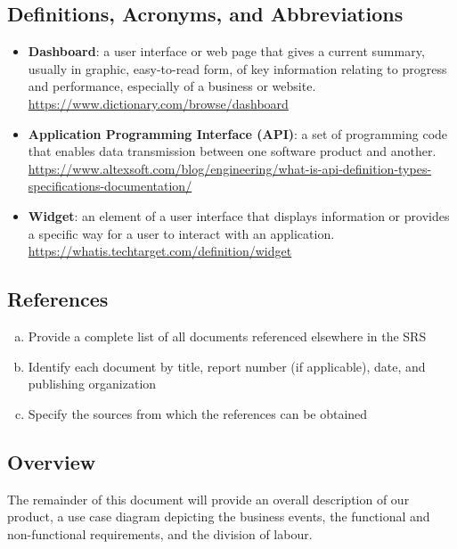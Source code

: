 \documentclass[]{article}
\begin{document}
\subsection{Definitions, Acronyms, and Abbreviations}
\label{sub:definitions_acronyms_and_abbreviations}
\begin{itemize}
	\item \textbf{Dashboard}: a user interface or web page that gives a current summary, usually in graphic, easy-to-read form, of key information relating to progress and performance, especially of a business or website. \url{https://www.dictionary.com/browse/dashboard}
	
	\item \textbf{Application Programming Interface (API)}: a set of programming code that enables data transmission between one software product and another. \url{https://www.altexsoft.com/blog/engineering/what-is-api-definition-types-specifications-documentation/}
	
    \item \textbf{Widget}: an element of a user interface that displays information or provides a specific way for a user to interact with an application. \url{https://whatis.techtarget.com/definition/widget}
\end{itemize}

\subsection{References}
\label{sub:references}
\begin{enumerate}[a)]
	\item Provide a complete list of all documents referenced elsewhere in the SRS
	\item Identify each document by title, report number (if applicable), date, and publishing organization
	\item Specify the sources from which the references can be obtained
\end{enumerate}

\subsection{Overview}
\label{sub:overview}
The remainder of this document will provide an overall description of our product, a use case diagram depicting the business events, the functional and non-functional requirements, and the division of labour. 
\begin{enumerate}[a)]

\end{enumerate}
\end{document}
